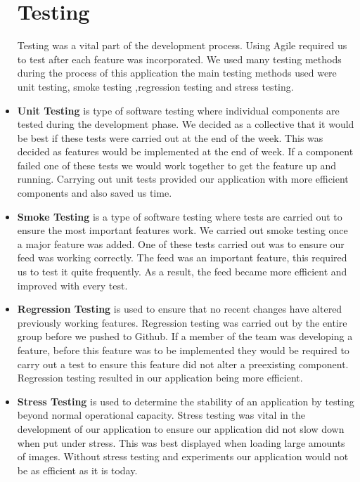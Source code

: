 \begin{itemize}
\section{Testing}
Testing was a vital part of the development process. Using Agile required us to test after each feature was incorporated. We used many testing methods during the process of this application the main testing methods used were unit testing, smoke testing ,regression testing and stress testing.

\item \textbf{Unit Testing}
 is type of software testing where individual components are tested during the development phase. \newline
We decided as a collective that it would be best if these tests were carried out at the end of the week. This was decided as features would be implemented at the end of week. If a component failed one of these tests we would work together to get the feature up and running. Carrying out unit tests provided our application with more efficient components and also saved us time.

\item \textbf{Smoke Testing}
 is a type of software testing where tests are carried out to ensure the most important features work.\newline
We carried out smoke testing once a major feature was added. One of these tests carried out was to ensure our feed was working correctly. The feed was an important feature, this required us to test it quite frequently. As a result, the feed became more efficient and improved with every test.

\item \textbf{Regression Testing}
 is used to ensure that no recent changes have altered previously working features.\newline
Regression testing was carried out by the entire group before we pushed to Github. If a member of the team was developing a feature, before this feature was to be implemented they would be required to carry out a test to ensure this feature did not alter a preexisting component. Regression testing resulted in our application being more efficient.

\item \textbf{Stress Testing}
 is used to determine the stability of an application by testing beyond normal operational capacity.\newline
Stress testing was vital in the development of our application to ensure our application did not slow down when put under stress. This was best displayed when loading large amounts of images. Without stress testing and experiments our application would not be as efficient as it is today.


\end{itemize}
